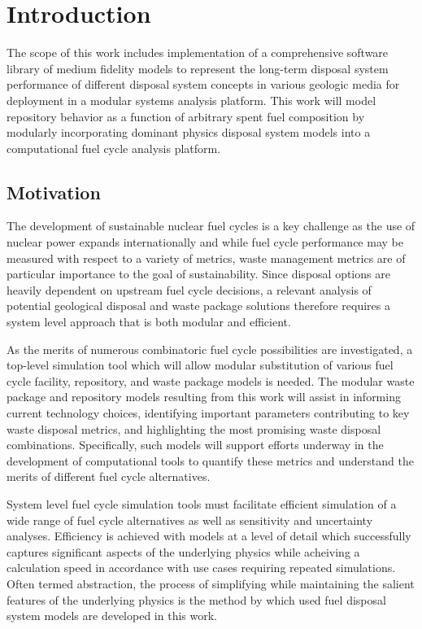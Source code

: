 \chapter{Introduction}\label{ch:introduction}

The scope of this work includes implementation of a comprehensive 
software library of medium fidelity models to represent the long-term 
disposal system performance of different disposal system concepts in 
various geologic media for deployment in a modular systems analysis 
platform.  This work will model repository behavior as a function of 
arbitrary spent fuel composition by modularly incorporating dominant 
physics disposal system models into a computational fuel cycle 
analysis platform.

\section{Motivation} 

The development of sustainable nuclear fuel cycles is a key challenge 
as the use of nuclear power expands internationally and while fuel 
cycle performance may be measured with respect to a variety of 
metrics, waste management metrics are of particular importance to the 
goal of sustainability. Since disposal options are heavily dependent 
on upstream fuel cycle decisions, a relevant analysis of potential 
geological disposal and waste package solutions therefore requires a 
system level approach that is both modular and efficient. 

As the merits of numerous combinatoric fuel cycle possibilities are 
investigated, a top-level simulation tool which will allow modular 
substitution of various fuel cycle facility, repository, and waste 
package models is needed. The modular waste package and repository 
models resulting from this work will assist in informing current 
technology choices, identifying important parameters contributing to 
key waste disposal metrics, and highlighting the most promising waste 
disposal combinations. Specifically, such models will support efforts 
underway in the development of computational tools to quantify these 
metrics and understand the merits of different fuel cycle 
alternatives. 

System level fuel cycle simulation tools must facilitate efficient 
simulation of a wide range of fuel cycle alternatives as well as 
sensitivity and uncertainty analyses. Efficiency is achieved with 
models at a level of detail which successfully captures significant 
aspects of the underlying physics while acheiving a calculation speed 
in accordance with use cases requiring repeated simulations. Often 
termed abstraction, the process of simplifying while maintaining the 
salient features of the underlying physics is the method by which used 
fuel disposal system models are developed in this work. 

